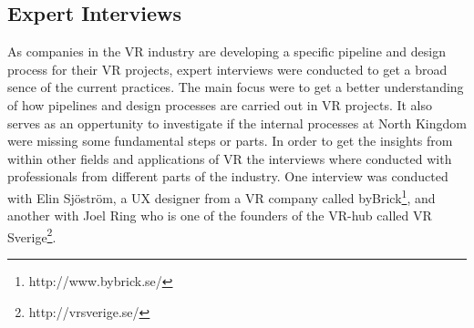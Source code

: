 \subsection{Expert Interviews}
As companies in the VR industry are developing a specific pipeline and design process for their VR projects, expert interviews were conducted to get a broad sence of the current practices. The main focus were to get a better understanding of how pipelines and design processes are carried out in VR projects. It also serves as an oppertunity to investigate if the internal processes at North Kingdom were missing some fundamental steps or parts. In order to get the insights from within other fields and applications of VR the interviews where conducted with professionals from different parts of the industry. One interview was conducted with Elin Sj\"ostr\"om, a UX designer from a VR company called byBrick\footnote{http://www.bybrick.se/}, and another with Joel Ring who is one of the founders of the VR-hub called VR Sverige\footnote{http://vrsverige.se/}.
